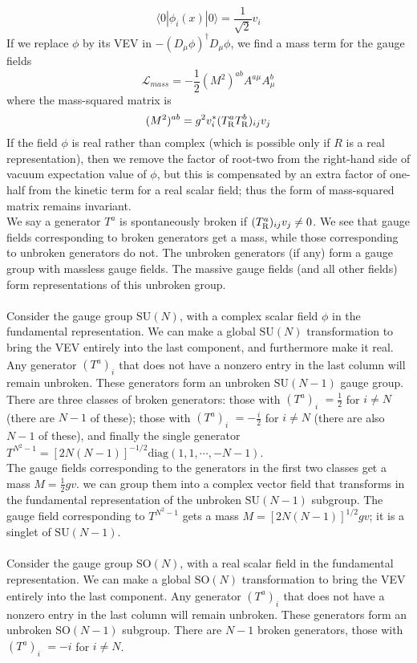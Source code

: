 \[\langle 0 | \phi_i(x) | 0 \rangle = \frac{1}{\sqrt{2}}v_i\]
If we replace $\phi$ by its VEV in $-(D_{\mu}\phi)^{\dagger}D_{\mu}\phi$, we find a mass term for the gauge fields
\[\mathcal{L}_{mass} = - \frac{1}{2}(M^2)^{ab}A^{a\mu}A^b_{\mu}\]
where the mass-squared matrix is
\[(M^2)^{ab} = g^2 v_i^* (T^a_{\rm R} T^b_{\rm R})_{ij}v_j \]
If the field $\phi$ is real rather than complex (which is possible only if $R$ is a real representation), then we remove the factor of root-two from the right-hand side of vacuum expectation value of $\phi$, but this is compensated by an extra factor of one-half from the kinetic term for a real scalar field; thus the form of mass-squared matrix remains invariant.
\\
We say a generator $T^a$ is spontaneously broken if $(T^a_{\rm R})_{ij}v_j \neq 0$. We see that gauge fields corresponding to broken generators get a mass, while those corresponding to unbroken generators do not. The unbroken generators (if any) form a gauge group with massless gauge fields. The massive gauge fields (and all other fields) form
representations of this unbroken group.
\\ \\
Consider the gauge group $\mathrm{SU}(N)$, with a complex scalar field $\phi$ in the fundamental representation. We can make a global $\mathrm{SU}(N)$ transformation to bring the VEV entirely into the last component, and furthermore make it real. 
Any generator $(T^a)_{i}^{\phantom{j}}$ that does not have a nonzero entry in the last column will remain unbroken. These generators form an unbroken $\mathrm{SU}(N-1)$ gauge group. There are three classes of broken generators: those with $(T^a)_{i}^{\phantom{N}} = \frac{1}{2}$  for $i \neq N$ (there are $N-1$ of these); those with
$(T^a)_{i}^{\phantom{N}} = -\frac{i}{2}$  for $i \neq N$ (there are also $N - 1$ of these), and finally the single
generator $T^{N^2 - 1} = [2N(N-1)]^{-1/2} \mathrm{diag}(1,1,\cdots,-N-1)$. 
\\
The gauge fields corresponding to the generators in the first two classes get a mass $M = \frac{1}{2}gv$.
we can group them into a complex vector field that transforms in the fundamental representation of the unbroken $\mathrm{SU}(N-1)$ subgroup. The gauge field corresponding to $T^{N^2-1}$ gets a mass $M = [2N(N-1)]^{1/2}gv$; it is a singlet of $\mathrm{SU}(N-1)$.
\\ \\
Consider the gauge group $\mathrm{SO}(N)$, with a real scalar field in the fundamental representation. We can make a global $\mathrm{SO}(N)$ transformation to bring the VEV entirely into the last component. Any generator $(T^a)_{i}^{\phantom{j}}$ that does not have a nonzero entry in the last column will remain unbroken. These generators form an unbroken $\mathrm{SO}(N-1)$ subgroup. There are $N - 1$ broken generators, those with $(T^a)_{i}^{\phantom{N}} = -i$  for $i \neq N$. 
